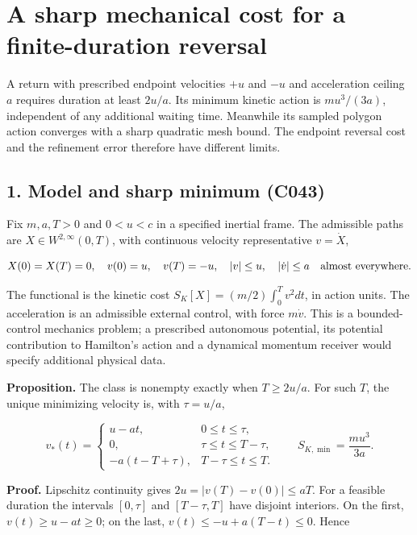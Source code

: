 \documentclass[11pt,a4paper]{article}
\begin{document}
\hypertarget{a-sharp-mechanical-cost-for-a-finite-duration-reversal}{%
\section{A sharp mechanical cost for a finite-duration
reversal}\label{a-sharp-mechanical-cost-for-a-finite-duration-reversal}}

A return with prescribed endpoint velocities \(+u\) and \(-u\) and
acceleration ceiling \(a\) requires duration at least \(2u/a\). Its
minimum kinetic action is \(mu^3/(3a)\), independent of any additional
waiting time. Meanwhile its sampled polygon action converges with a
sharp quadratic mesh bound. The endpoint reversal cost and the
refinement error therefore have different limits.

\hypertarget{model-and-sharp-minimum-c043}{%
\subsection{1. Model and sharp minimum
(C043)}\label{model-and-sharp-minimum-c043}}

Fix \(m,a,T>0\) and \(0<u<c\) in a specified inertial frame. The
admissible paths are \(X\in W^{2,\infty}(0,T)\), with continuous
velocity representative \(v=\dot X\),

\[
X(0)=X(T)=0,\quad v(0)=u,\quad v(T)=-u,\quad
|v|\le u,\quad |\dot v|\le a\quad\hbox{almost everywhere}.
\]

The functional is the kinetic cost \(S_K[X]=(m/2)\int_0^T v^2dt\), in
action units. The acceleration is an admissible external control, with
force \(m\dot v\). This is a bounded-control mechanics problem; a
prescribed autonomous potential, its potential contribution to
Hamilton's action and a dynamical momentum receiver would specify
additional physical data.

\textbf{Proposition.} The class is nonempty exactly when \(T\ge2u/a\).
For such \(T\), the unique minimizing velocity is, with \(\tau=u/a\),

\[
v_*(t)=\begin{cases}
u-at,&0\le t\le\tau,\\
0,&\tau\le t\le T-\tau,\\
-a(t-T+\tau),&T-\tau\le t\le T.
\end{cases}
\qquad S_{K,\min}=\frac{mu^3}{3a}.
\]

\textbf{Proof.} Lipschitz continuity gives \(2u=|v(T)-v(0)|\le aT\). For
a feasible duration the intervals \([0,\tau]\) and \([T-\tau,T]\) have
disjoint interiors. On the first, \(v(t)\ge u-at\ge0\); on the last,
\(v(t)\le-u+a(T-t)\le0\). Hence
\end{document}
